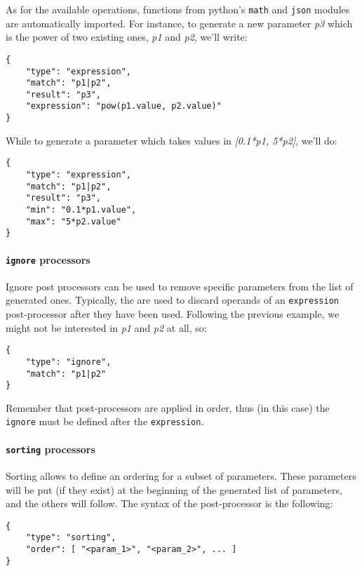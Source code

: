 \documentclass[11pt,notitlepage,twoside,a4paper]{article}
\begin{document}
As for the available operations, functions from python's \texttt{math}
and \texttt{json} modules are automatically imported. For instance, to
generate a new parameter \emph{p3} which is the power of two existing
ones, \emph{p1} and \emph{p2}, we'll write:

\begin{lstlisting}
{
    "type": "expression",
    "match": "p1|p2",
    "result": "p3",
    "expression": "pow(p1.value, p2.value)"
}
\end{lstlisting}

\newpage
\noindent
While to generate a parameter which takes values in \emph{{[}0.1*p1,
5*p2{]}}, we'll do:

\begin{lstlisting}
{
    "type": "expression",
    "match": "p1|p2",
    "result": "p3",
    "min": "0.1*p1.value",
    "max": "5*p2.value"
}
\end{lstlisting}

\paragraph{\texttt{ignore} processors}

Ignore post processors can be used to remove specific parameters from
the list of generated ones. Typically, the are used to discard operands
of an \texttt{expression} post-processor after they have been used.
Following the previous example, we might not be interested in \emph{p1}
and \emph{p2} at all, so:

\begin{lstlisting}
{
    "type": "ignore",
    "match": "p1|p2"
}
\end{lstlisting}

Remember that post-processors are applied in order, thus (in this case)
the \texttt{ignore} must be defined after the \texttt{expression}.

\paragraph{\texttt{sorting} processors}

Sorting allows to define an ordering for a subset of parameters. These
parameters will be put (if they exist) at the beginning of the generated
list of parameters, and the others will follow. The syntax of the
post-processor is the following:

\begin{lstlisting}
{
    "type": "sorting",
    "order": [ "<param_1>", "<param_2>", ... ]
}
\end{lstlisting}
\end{document}
